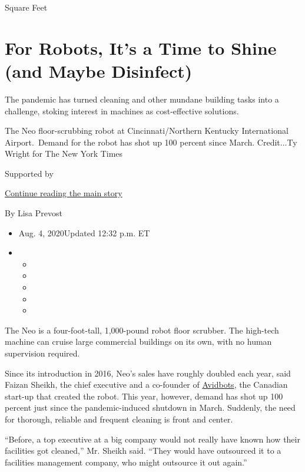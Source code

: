 Square Feet

\hypertarget{for-robots-its-a-time-to-shine-and-maybe-disinfect}{%
\section{For Robots, It's a Time to Shine (and Maybe
Disinfect)}\label{for-robots-its-a-time-to-shine-and-maybe-disinfect}}

The pandemic has turned cleaning and other mundane building tasks into a
challenge, stoking interest in machines as cost-effective solutions.

The Neo floor-scrubbing robot at Cincinnati/Northern Kentucky
International Airport.~Demand for the robot has shot up 100 percent
since March. Credit...Ty Wright for The New York Times

Supported by

\protect\hyperlink{after-sponsor}{Continue reading the main story}

By Lisa Prevost

\begin{itemize}
\item
  Aug. 4, 2020Updated 12:32 p.m. ET
\item
  \begin{itemize}
  \item
  \item
  \item
  \item
  \item
  \end{itemize}
\end{itemize}

The Neo is a four-foot-tall, 1,000-pound robot floor scrubber. The
high-tech machine can cruise large commercial buildings on its own, with
no human supervision required.

Since its introduction in 2016, Neo's sales have roughly doubled each
year, said Faizan Sheikh, the chief executive and a co-founder of
\href{https://www.avidbots.com/}{Avidbots}, the Canadian start-up that
created the robot. This year, however, demand has shot up 100 percent
just since the pandemic-induced shutdown in March. Suddenly, the need
for thorough, reliable and frequent cleaning is front and center.

``Before, a top executive at a big company would not really have known
how their facilities got cleaned,'' Mr. Sheikh said. ``They would have
outsourced it to a facilities management company, who might outsource it
out again.''

